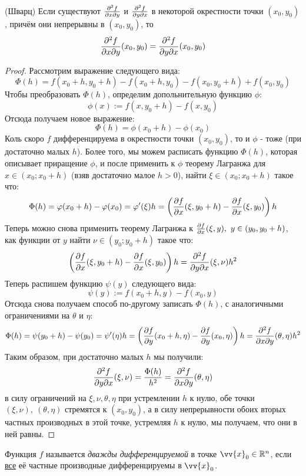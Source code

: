 \begin{theorem} (Шварц)
	Если существуют $\frac{\partial^2 f}{\partial x \partial y}$ и $\frac{\partial^2 f}{\partial y \partial x}$ в некоторой окрестности точки $(x_0, y_0)$, причём они непрерывны в $(x_0, y_0)$, то
	\[
		\frac{\partial^2 f}{\partial x \partial y} (x_0, y_0) = \frac{\partial^2 f}{\partial y \partial x} (x_0, y_0)
	\]
\end{theorem}

\begin{proof}
	Рассмотрим выражение следующего вида:
	\[
		\Phi (h) = f(x_0 + h, y_0 + h) - f(x_0 + h, y_0) - f(x_0, y_0 + h) + f(x_0, y_0)
	\]
	Чтобы преобразовать $\Phi(h)$, определим допольнительную функцию $\phi$:
	\[
		\phi(x) := f(x, y_0 + h) - f(x, y_0)
	\]
	Отсюда получаем новое выражение:
	\[
		\Phi(h) = \phi(x_0 + h) - \phi(x_0)
	\]
	Коль скоро $f$ дифференцируема в окрестности точки $(x_0, y_0)$, то и $\phi$ - тоже (при достаточно малых $h$). Более того, мы можем расписать функцию $\Phi(h)$, которая описывает приращение $\phi$, и после применить к $\phi$ теорему Лагранжа для $x \in (x_0; x_0 + h)$ (взяв достаточно малое $h>0$), найти $\xi\in (x_0; x_0 + h)$ такое что:
	\[
		\Phi(h) = \varphi(x_0 + h) - \varphi(x_0) = \varphi'(\xi) h = \left(\frac{\partial f}{\partial x} (\xi, y_0 + h) - \frac{\partial f}{\partial x} (\xi, y_0)\right) h
	\]
	Теперь можно снова применить теорему Лагранжа к $\frac{\partial f}{\partial x} (\xi, y),\ y \in (y_0, y_0 + h)$, как функции от $y$ найти $\nu\in (y_0; y_0 + h)$ такое что:
	\[
		\left(\frac{\partial f}{\partial x} (\xi, y_0 + h) - \frac{\partial f}{\partial x} (\xi, y_0)\right) h = \frac{\partial^2 f}{\partial y \partial x} (\xi, \nu) h^2
	\]
	Теперь распишем функцию $\psi(y)$ следующего вида:
	\[
		\psi(y) := f(x_0 + h, y) - f(x_0, y)
	\]
	Отсюда снова получаем способ по-другому записать $\Phi(h)$, с аналогичными ограничениями на $\theta$ и $\eta$:
	\[
		\Phi(h) = \psi(y_0 + h) - \psi(y_0) = \psi'(\eta) h = \left(\frac{\partial f}{\partial y} (x_0 + h, \eta) - \frac{\partial f}{\partial y} (x_0, \eta)\right) h = \frac{\partial^2 f}{\partial x \partial y} (\theta, \eta) h^2
	\]
	Таким образом, при достаточно малых $h$ мы получили:
	\[
		\frac{\partial^2 f}{\partial y \partial x} (\xi, \nu) = \frac{\Phi(h)}{h^2}=\frac{\partial^2 f}{\partial x \partial y} (\theta, \eta)
	\]
	в силу ограничений на $\xi, \nu, \theta, \eta$ при устремлении $h$ к нулю, обе точки $(\xi, \nu),\ (\theta, \eta)$ стремятся к $(x_0, y_0)$, а в силу непрерывности обоих вторых частных производных в этой точке, устремляя $h$ к нулю, мы получаем, что они в ней равны. 
\end{proof}

\begin{definition}
	Функция $f$ называется \textit{дважды дифференцируемой} в точке $\vv{x}_0 \in \R^n$, если \underline{все} её частные производные дифференцируемы в $\vv{x}_0$.
\end{definition}

